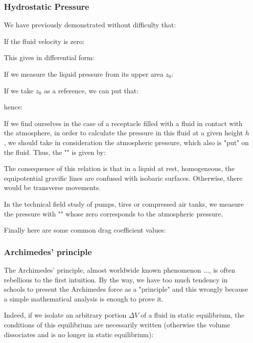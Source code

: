 	
	\subsubsection{Hydrostatic Pressure}
	We have previously demonstrated without difficulty that:
	
	If the fluid velocity is zero:
	
	This gives in differential form:
	
	If we measure the liquid pressure from its upper area $z_0$:
	
	If we take $z_0$ as a reference, we can put that:
	
	hence:
	
	If we find ourselves in the case of a receptacle filled with a fluid in contact with the atmosphere, in order to calculate the pressure in this fluid at a given height $h$, we should take in consideration the atmospheric pressure, which also is "put" on the fluid. Thus, the "" is given by:
	
	The consequence of this relation is that in a liquid at rest, homogeneous, the equipotential gravific lines are confused with isobaric surfaces. Otherwise, there would be transverse movements.
	
	\begin{tcolorbox}[title=Remark,colframe=black,arc=10pt]
	 In the technical field study of pumps, tires or compressed air tanks, we measure the pressure with "" whose zero corresponds to the atmospheric pressure.
	\end{tcolorbox}
	
	Finally here are some common drag coefficient values:
		
	
	\pagebreak
	\subsubsection{Archimedes' principle}
	The Archimedes' principle, almost worldwide known phenomenon ..., is often rebellious to the first intuition. By the way, we have too much tendency in schools to present the Archimedes force as a "principle" and this wrongly because a simple mathematical analysis is enough to prove it.

	Indeed, if we isolate an arbitrary portion $\Delta V$ of a fluid in static equilibrium, the conditions of this equilibrium are necessarily written (otherwise the volume dissociates and is no longer in static equilibrium):
	
